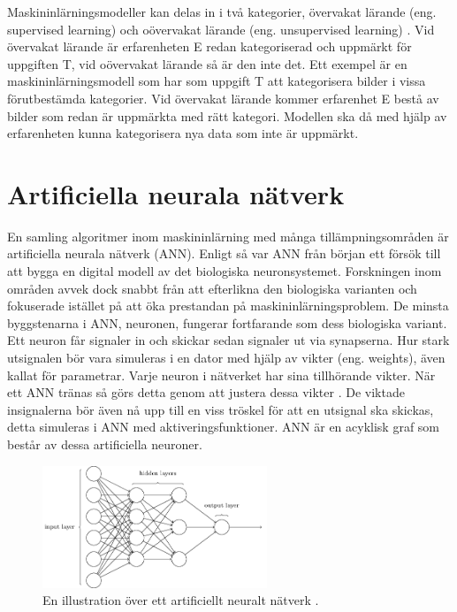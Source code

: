 \documentclass[]{kththesis}
\begin{document}
Maskininlärningsmodeller kan delas in i två kategorier, övervakat lärande (eng. supervised learning) och oövervakat lärande (eng. unsupervised learning) \parencite{murphy2012machine}. Vid övervakat lärande är erfarenheten E redan kategoriserad och uppmärkt för uppgiften T, vid oövervakat lärande så är den inte det. Ett exempel är en maskininlärningsmodell som har som uppgift T att kategorisera bilder i vissa förutbestämda kategorier. Vid övervakat lärande kommer erfarenhet E bestå av bilder som redan är uppmärkta med rätt kategori. Modellen ska då med hjälp av erfarenheten kunna kategorisera nya data som inte är uppmärkt. 

\section{Artificiella  neurala nätverk}
En samling algoritmer inom maskininlärning med många tillämpningsområden är artificiella neurala nätverk (ANN). Enligt \textcite{Goodfellow-et-al-2016} så var ANN från början ett försök till att bygga en digital modell av det biologiska neuronsystemet. Forskningen inom områden avvek dock snabbt från att efterlikna den biologiska varianten och fokuserade istället på att öka prestandan på maskininlärningsproblem. De minsta byggstenarna i ANN, neuronen, fungerar fortfarande som dess biologiska variant. Ett neuron får signaler in och skickar sedan signaler ut via synapserna. Hur stark utsignalen bör vara simuleras i en dator med hjälp av vikter (eng. weights), även kallat för parametrar. Varje neuron i nätverket har sina tillhörande vikter. När ett ANN tränas så görs detta genom att justera dessa vikter \parencite{Goodfellow-et-al-2016}. De viktade insignalerna bör även nå upp till en viss tröskel för att en utsignal ska skickas, detta simuleras i ANN med aktiveringsfunktioner. ANN är en acyklisk graf som består av dessa artificiella neuroner.

\begin{figure}[h]
  \centering
  \includegraphics[width=0.6\textwidth]{nn}
  \caption{En illustration över ett artificiellt neuralt nätverk \parencite{nielsen2015neural}.}
\end{figure}
\end{document}
